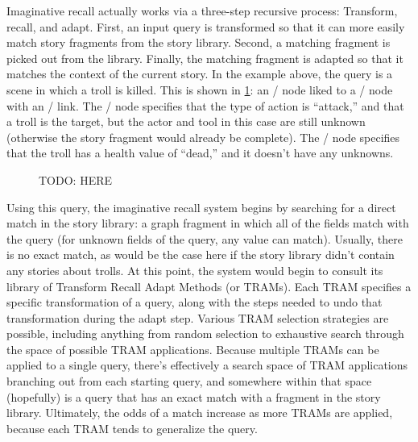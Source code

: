 Imaginative recall actually works via a three-step recursive process: Transform, recall, and adapt.
%
First, an input query is transformed so that it can more easily match story fragments from the story library.
%
Second, a matching fragment is picked out from the library.
%
Finally, the matching fragment is adapted so that it matches the context of the current story.
%
In the example above, the query is a scene in which a troll is killed.
%
This is shown in \cref{fig:im-example}: an \gna/ node liked to a \gns/ node with an \gei/ link.
%
The \gna/ node specifies that the type of action is ``attack,'' and that a troll is the target, but the actor and tool in this case are still unknown (otherwise the story fragment would already be complete).
%
The \gns/ node specifies that the troll has a health value of ``dead,'' and it doesn't have any unknowns.


\begin{figure}
\caption{TODO: HERE}
\label{fig:im-example}
\end{figure}


Using this query, the imaginative recall system begins by searching for a direct match in the story library: a graph fragment in which all of the fields match with the query (for unknown fields of the query, any value can match).
%
Usually, there is no exact match, as would be the case here if the story library didn't contain any stories about trolls.
%
At this point, the system would begin to consult its library of Transform Recall Adapt Methods (or TRAMs).
%
Each TRAM specifies a specific transformation of a query, along with the steps needed to undo that transformation during the adapt step.
%
Various TRAM selection strategies are possible, including anything from random selection to exhaustive search through the space of possible TRAM applications.
%
Because multiple TRAMs can be applied to a single query, there's effectively a search space of TRAM applications branching out from each starting query, and somewhere within that space (hopefully) is a query that has an exact match with a fragment in the story library.
%
Ultimately, the odds of a match increase as more TRAMs are applied, because each TRAM tends to generalize the query.


